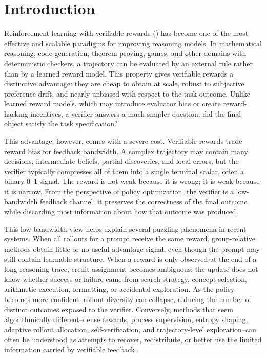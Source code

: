 \section{Introduction}

Reinforcement learning with verifiable rewards (\rlvr{}) has become one of the most effective and scalable paradigms for improving reasoning models. In mathematical reasoning, code generation, theorem proving, games, and other domains with deterministic checkers, a trajectory can be evaluated by an external rule rather than by a learned reward model. This property gives verifiable rewards a distinctive advantage: they are cheap to obtain at scale, robust to subjective preference drift, and nearly unbiased with respect to the task outcome. Unlike learned reward models, which may introduce evaluator bias or create reward-hacking incentives, a verifier answers a much simpler question: did the final object satisfy the task specification?

This advantage, however, comes with a severe cost. Verifiable rewards trade reward bias for feedback bandwidth. A complex trajectory may contain many decisions, intermediate beliefs, partial discoveries, and local errors, but the verifier typically compresses all of them into a single terminal scalar, often a binary $0$--$1$ signal. The reward is not weak because it is wrong; it is weak because it is narrow. From the perspective of policy optimization, the verifier is a low-bandwidth feedback channel: it preserves the correctness of the final outcome while discarding most information about how that outcome was produced.

This low-bandwidth view helps explain several puzzling phenomena in recent \rlvr{} systems. When all rollouts for a prompt receive the same reward, group-relative methods obtain little or no useful advantage signal, even though the prompt may still contain learnable structure. When a reward is only observed at the end of a long reasoning trace, credit assignment becomes ambiguous: the update does not know whether success or failure came from search strategy, concept selection, arithmetic execution, formatting, or accidental exploration. As the policy becomes more confident, rollout diversity can collapse, reducing the number of distinct outcomes exposed to the verifier. Conversely, methods that seem algorithmically different--dense rewards, process supervision, entropy shaping, adaptive rollout allocation, self-verification, and trajectory-level exploration--can often be understood as attempts to recover, redistribute, or better use the limited information carried by verifiable feedback \cite{hybrid_reinforcement_2026,exploration_exploitation_rlvr_2026,lookahead_rollouts_2026,eepo_2026,no_prompt_left_behind_2026,igpo_2026}.

